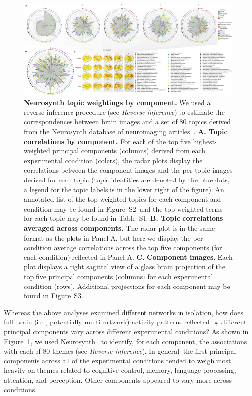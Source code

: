 \documentclass[english, 11pt]{article}
\newcommand{\topTerms}{S2}
\newcommand{\componentBrains}{S3}
\newcommand{\topics}{S1}
\begin{document}
\begin{figure}
  \centering
  \includegraphics[width=\textwidth]{figs/neurosynth_by_component}

\caption{\textbf{Neurosynth topic weightings by component.} We used a reverse
inference procedure (see \textit{Reverse inference}) to estimate the
correspondences between brain images and a set of 80 topics derived from the
Neurosynth database of neuroimaging articles~\citep{RubiEtal17}. \textbf{A.
Topic correlations by component.} For each of the top five highest-weighted
principal components (columns) derived from each experimental condition
(colors), the radar plots display the correlations between the component images
and the per-topic images derived for each topic (topic identities are denoted
by the blue dots; a legend for the topic labels is in the lower right of the
figure). An annotated list of the top-weighted topics for each component and
condition may be found in Figure~\topTerms~and the top-weighted terms for each
topic may be found in Table~\topics. \textbf{B. Topic correlations averaged
across components.} The radar plot is in the same format as the plots in Panel
A, but here we display the per-condition average correlations across the top
five components (for each condition) reflected in Panel A. \textbf{C. Component
images.} Each plot displays a right sagittal view of a glass brain projection of
the top five principal components (columns) for each experimental condition
(rows). Additional projections for each component may be found in
Figure~\componentBrains.}

\label{fig:neurosynth-pca}

\end{figure}

Whereas the above analyses examined different networks in isolation, how does
full-brain (i.e., potentially multi-network) activity patterns reflected by
different principal components vary across different experimental conditions?
As shown in Figure~\ref{fig:neurosynth-pca}, we used
Neurosynth~\citep{RubiEtal17} to identify, for each component, the associations
with each of 80 themes (see \textit{Reverse inference}). In general, the first
principal components across all of the experimental conditions tended to weigh
most heavily on themes related to cognitive control, memory, language
processing, attention, and perception. Other components appeared to vary more
across conditions.
\end{document}
